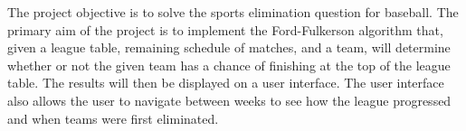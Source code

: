 The project objective is to solve the sports elimination question for baseball.
The primary aim of the project is to implement the Ford-Fulkerson algorithm
that, given a league table, remaining schedule of matches, and a team, will
determine whether or not the given team has a chance of finishing at the top of
the league table. The results will then be displayed on a user interface. The
user interface also allows the user to navigate between weeks to see how the
league progressed and when teams were first eliminated.
